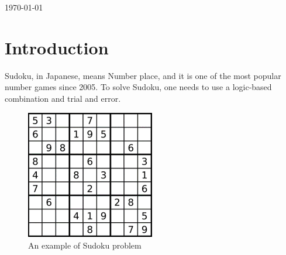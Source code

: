 \begin{titlepage}


{\large \today}\\[2cm] %


 

\vfill %

\end{titlepage}




\section{Introduction}
	Sudoku, in Japanese, means Number place, and it is one of the most popular number games since 2005. 
	To solve Sudoku, one needs to use a logic-based combination and trial and error. 

	\begin{figure}[ht]
	\centering
	\includegraphics[width=0.5\textwidth]{figure/sudoku1.png}
	\caption{An example of Sudoku problem}
	\label{fig:sudoku1}
	\end{figure}

